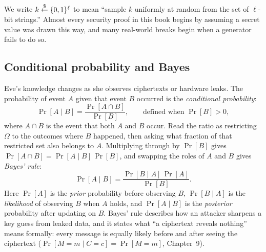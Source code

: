 We write $k \stackrel{\$}{\gets} \{0,1\}^{\ell}$ to mean ``sample $k$ uniformly at random from the set of $\ell$-bit strings.'' Almost every security proof in this book begins by assuming a secret value was drawn this way, and many real-world breaks begin when a generator fails to do so.

\subsection{Conditional probability and Bayes}

Eve's knowledge changes as she observes ciphertexts or hardware leaks. The probability of event $A$ given that event $B$ occurred is the \emph{conditional probability}:
\[
  \Pr[A \mid B] = \frac{\Pr[A \cap B]}{\Pr[B]}, \qquad \text{defined when } \Pr[B] > 0,
\]
where $A \cap B$ is the event that both $A$ and $B$ occur. Read the ratio as restricting $\Omega$ to the outcomes where $B$ happened, then asking what fraction of that restricted set also belongs to $A$. Multiplying through by $\Pr[B]$ gives $\Pr[A \cap B] = \Pr[A \mid B]\,\Pr[B]$, and swapping the roles of $A$ and $B$ gives \emph{Bayes' rule}:
\[
  \Pr[A \mid B] = \frac{\Pr[B \mid A]\,\Pr[A]}{\Pr[B]}.
\]
Here $\Pr[A]$ is the \emph{prior} probability before observing $B$, $\Pr[B \mid A]$ is the \emph{likelihood} of observing $B$ when $A$ holds, and $\Pr[A \mid B]$ is the \emph{posterior} probability after updating on $B$. Bayes' rule describes how an attacker sharpens a key guess from leaked data, and it states what ``a ciphertext reveals nothing'' means formally: every message is equally likely before and after seeing the ciphertext ($\Pr[M = m \mid C = c] = \Pr[M = m]$, Chapter~9).

